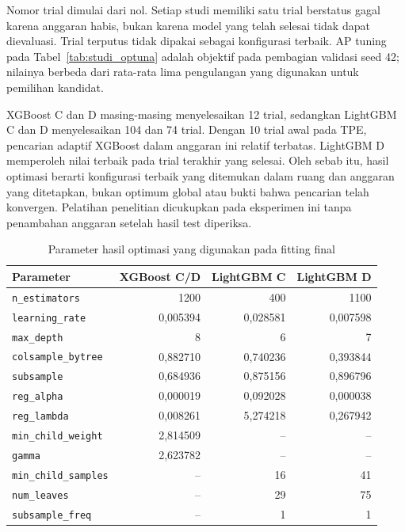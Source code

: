Nomor trial dimulai dari nol. Setiap studi memiliki satu trial berstatus gagal karena anggaran habis, bukan karena model yang telah selesai tidak dapat dievaluasi. Trial terputus tidak dipakai sebagai konfigurasi terbaik. AP tuning pada Tabel~\ref{tab:studi_optuna} adalah objektif pada pembagian validasi seed 42; nilainya berbeda dari rata-rata lima pengulangan yang digunakan untuk pemilihan kandidat.

XGBoost C dan D masing-masing menyelesaikan 12 trial, sedangkan LightGBM C dan D menyelesaikan 104 dan 74 trial. Dengan 10 trial awal pada TPE, pencarian adaptif XGBoost dalam anggaran ini relatif terbatas. LightGBM D memperoleh nilai terbaik pada trial terakhir yang selesai. Oleh sebab itu, hasil optimasi berarti konfigurasi terbaik yang ditemukan dalam ruang dan anggaran yang ditetapkan, bukan optimum global atau bukti bahwa pencarian telah konvergen. Pelatihan penelitian dicukupkan pada eksperimen ini tanpa penambahan anggaran setelah hasil test diperiksa.

\begin{table}[htbp]
\centering
\caption{Parameter hasil optimasi yang digunakan pada fitting final}
\label{tab:parameter_terpilih}
\small
\setlength{\tabcolsep}{4pt}
\begin{tabular}{lrrr}
\toprule
Parameter & XGBoost C/D & LightGBM C & LightGBM D \\
\midrule
\texttt{n\_estimators} & 1200 & 400 & 1100 \\
\texttt{learning\_rate} & 0,005394 & 0,028581 & 0,007598 \\
\texttt{max\_depth} & 8 & 6 & 7 \\
\texttt{colsample\_bytree} & 0,882710 & 0,740236 & 0,393844 \\
\texttt{subsample} & 0,684936 & 0,875156 & 0,896796 \\
\texttt{reg\_alpha} & 0,000019 & 0,092028 & 0,000038 \\
\texttt{reg\_lambda} & 0,008261 & 5,274218 & 0,267942 \\
\texttt{min\_child\_weight} & 2,814509 & -- & -- \\
\texttt{gamma} & 2,623782 & -- & -- \\
\texttt{min\_child\_samples} & -- & 16 & 41 \\
\texttt{num\_leaves} & -- & 29 & 75 \\
\texttt{subsample\_freq} & -- & 1 & 1 \\
\bottomrule
\end{tabular}
\end{table}

